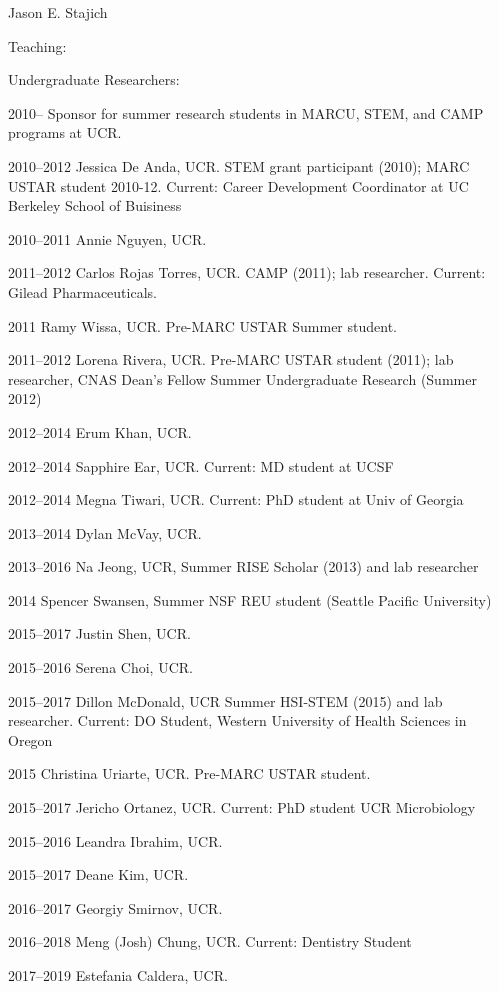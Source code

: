 \documentclass[10pt]{article}
\begin{document}
\begin{cv}{\centerline{Jason E. Stajich}}
\begin{cvlistcompact}{Teaching:}
\end{cvlistcompact}

\begin{cvlistcompact}{Undergraduate Researchers:}
\item[2010--] Sponsor for summer research students in MARCU, STEM, and CAMP
  programs at UCR.
\item [2010--2012] Jessica De Anda, UCR. STEM grant participant
  (2010); MARC USTAR student 2010-12. Current: Career Development Coordinator at UC Berkeley School of Buisiness
\item [2010--2011] Annie Nguyen, UCR.
\item [2011--2012] Carlos Rojas Torres, UCR. CAMP (2011); lab
  researcher. Current: Gilead Pharmaceuticals.
\item [2011] Ramy Wissa, UCR. Pre-MARC USTAR Summer student.
\item [2011--2012] Lorena Rivera, UCR. Pre-MARC USTAR student (2011); lab
  researcher, CNAS Dean's Fellow Summer Undergraduate Research (Summer 2012)
\item [2012--2014] Erum Khan, UCR.
\item [2012--2014] Sapphire Ear, UCR. Current: MD student at UCSF
\item [2012--2014] Megna Tiwari, UCR. Current: PhD student at Univ of Georgia
\item [2013--2014] Dylan McVay, UCR.
\item [2013--2016] Na Jeong, UCR, Summer RISE Scholar (2013) and lab researcher
\item [2014] Spencer Swansen, Summer NSF REU student (Seattle Pacific University)
\item [2015--2017] Justin Shen, UCR.
\item [2015--2016] Serena Choi, UCR.
\item [2015--2017] Dillon McDonald, UCR Summer HSI-STEM (2015) and lab researcher. Current: DO Student, Western University of Health Sciences in Oregon
\item [2015] Christina Uriarte, UCR. Pre-MARC USTAR student.
\item [2015--2017] Jericho Ortanez, UCR. Current: PhD student UCR Microbiology
\item [2015--2016] Leandra Ibrahim, UCR.
\item [2015--2017] Deane Kim, UCR.
\item [2016--2017] Georgiy Smirnov, UCR.
\item [2016--2018] Meng (Josh) Chung, UCR. Current: Dentistry Student
\item [2017--2019] Estefania Caldera, UCR.

\end{cvlistcompact}
\end{cv}
\end{document}

